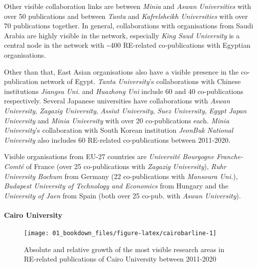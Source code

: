\documentclass[12pt,twoside]{report}
\let\oldparagraph\paragraph
\renewcommand{\paragraph}[1]{\oldparagraph{#1}\mbox{}}
\begin{document}
Other visible collaboration links are between \emph{Minia} and \emph{Aswan Universities} with over 50 publications and between \emph{Tanta} and \emph{Kafrelsheikh Universities} with over 70 publications together. In general, collaborations with organisations from Saudi Arabia are highly visible in the network, especially \emph{King Saud University} is a central node in the network with \textasciitilde400 RE-related co-publications with Egyptian organisations.

Other than that, East Asian organisations also have a visible presence in the co-publication network of Egypt. \emph{Tanta University}'s collaborations with Chinese institutions \emph{Jiangsu Uni.} and \emph{Huazhong Uni} include 60 and 40 co-publications respectively. Several Japanese universities have collaborations with \emph{Aswan University}, \emph{Zagazig University}, \emph{Assiut University}, \emph{Suez University}, \emph{Egypt Japan University} and \emph{Minia University} with over 20 co-publications each. \emph{Minia University}'s collaboration with South Korean institution \emph{JeonBuk National University} also includes 60 RE-related co-publications between 2011-2020.

Visible organisations from EU-27 countries are \emph{Université Bourgogne Franche-Comté} of France (over 25 co-publications with \emph{Zagazig University}), \emph{Ruhr University Bochum} from Germany (22 co-publications with \emph{Mansoura Uni.}), \emph{Budapest University of Technology and Economics} from Hungary and the \emph{University of Jaen} from Spain (both over 25 co-pub. with \emph{Aswan University}).

\hypertarget{cairo-university}{%
\paragraph{Cairo University}\label{cairo-university}}

\begin{figure}
\texttt{[image: 01\_bookdown\_files/figure-latex/cairobarline-1]} \caption{Absolute and relative growth of the most visible research areas in RE-related publications of Cairo University between 2011-2020}\label{fig:cairobarline}
\end{figure}
\end{document}

